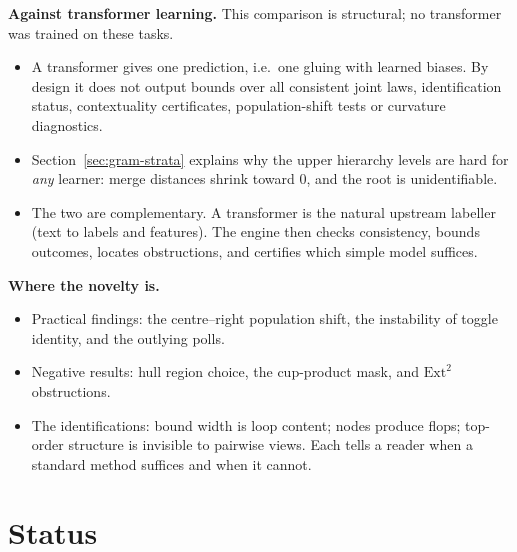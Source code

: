 \documentclass[11pt]{article}
\theoremstyle{definition}
\theoremstyle{remark}
\begin{document}
\textbf{Against transformer learning.} This comparison is structural; no transformer was trained on these tasks.
\begin{itemize}
  \item A transformer gives one prediction, i.e.\ one gluing with learned biases. By design it does not output bounds over all consistent joint laws, identification status, contextuality certificates, population-shift tests or curvature diagnostics.
  \item Section~\ref{sec:gram-strata} explains why the upper hierarchy levels are hard for \emph{any} learner: merge distances shrink toward $0$, and the root is unidentifiable.
  \item The two are complementary. A transformer is the natural upstream labeller (text to labels and features). The engine then checks consistency, bounds outcomes, locates obstructions, and certifies which simple model suffices.
\end{itemize}

\textbf{Where the novelty is.}
\begin{itemize}
  \item Practical findings: the centre--right population shift, the instability of toggle identity, and the outlying polls.
  \item Negative results: hull region choice, the cup-product mask, and $\mathrm{Ext}^2$ obstructions.
  \item The identifications: bound width is loop content; nodes produce flops; top-order structure is invisible to pairwise views. Each tells a reader when a standard method suffices and when it cannot.
\end{itemize}

\part{Status}
\end{document}
